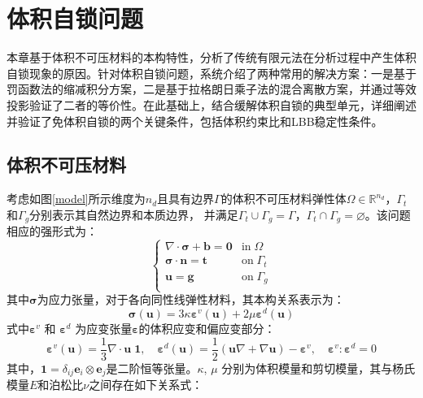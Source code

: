 \chapter{体积自锁问题}
本章基于体积不可压材料的本构特性，分析了传统有限元法在分析过程中产生体积自锁现象的原因。针对体积自锁问题，系统介绍了两种常用的解决方案：一是基于罚函数法的缩减积分方案，二是基于拉格朗日乘子法的混合离散方案，并通过等效投影验证了二者的等价性。在此基础上，结合缓解体积自锁的典型单元，详细阐述并验证了免体积自锁的两个关键条件，包括体积约束比和LBB稳定性条件。

\section{体积不可压材料}               
考虑如图\ref{model}所示维度为$n_d$且具有边界$\Gamma$的体积不可压材料弹性体$\Omega\in \mathbb R^{n_d}$，$\Gamma_t$和$\Gamma_g$分别表示其自然边界和本质边界，
并满足$\Gamma_t \cup \Gamma_g = \Gamma$，$\Gamma_t \cap \Gamma_g = \varnothing$。该问题相应的强形式为：
\begin{equation}\label{strong_penalty}
    \begin{cases}
        \nabla \cdot \boldsymbol \sigma + \boldsymbol b = \boldsymbol 0 & \mathrm{in} \; \Omega \\
        \boldsymbol \sigma \cdot \boldsymbol n = \boldsymbol t & \mathrm{on} \; \Gamma_t \\
        \boldsymbol u = \boldsymbol g & \mathrm{on} \; \Gamma_g \\
\end{cases}
\end{equation}
其中$\boldsymbol \sigma$为应力张量，对于各向同性线弹性材料，其本构关系表示为：
\begin{equation}\label{stress_penalty}
    \boldsymbol \sigma(\boldsymbol u) = 3\kappa \boldsymbol \varepsilon^v(\boldsymbol u) + 2\mu \boldsymbol \varepsilon^d(\boldsymbol u) 
\end{equation}
式中$\boldsymbol \varepsilon^v$ 和 $\boldsymbol \varepsilon^d$ 为应变张量$\boldsymbol \varepsilon$的体积应变和偏应变部分：
\begin{equation}
    \boldsymbol \varepsilon^v(\boldsymbol u) =\frac{1}{3} \nabla \cdot \boldsymbol u \; \boldsymbol 1, \quad
    \boldsymbol \varepsilon^d(\boldsymbol u) =\frac{1}{2}(\boldsymbol u \nabla + \nabla \boldsymbol u) - \boldsymbol \varepsilon^v, \quad
    \boldsymbol \varepsilon^v : \boldsymbol \varepsilon^d = 0
\end{equation}
其中，$\boldsymbol 1 = \delta_{ij} \boldsymbol e_i \otimes \boldsymbol e_j$是二阶恒等张量。$\kappa$, $\mu$ 分别为体积模量和剪切模量，其与杨氏模量$E$和泊松比$\nu$之间存在如下关系式：
